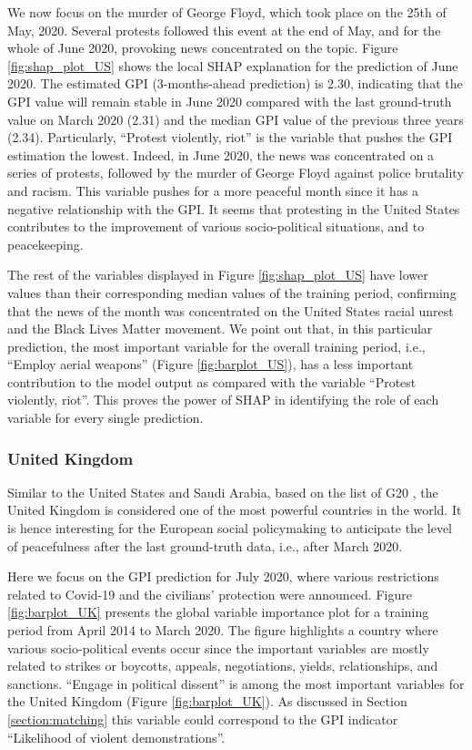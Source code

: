 \documentclass{bmcart}
\begin{document}
We now focus on the murder of George Floyd, which took place on the 25th of May, 2020. Several protests followed this event at the end of May, and for the whole of June 2020, provoking news concentrated on the topic. 
Figure \ref{fig:shap_plot_US} shows the local SHAP explanation for the prediction of June 2020. 
The estimated GPI (3-months-ahead prediction) is 2.30, indicating that the GPI value will remain stable in June 2020 compared with the last ground-truth value on March 2020 (2.31) and the median GPI value of the previous three years (2.34). 
Particularly, ``Protest violently, riot'' is the variable that pushes the GPI estimation the lowest. 
Indeed, in June 2020, the news was concentrated on a series of protests, followed by the murder of George Floyd against police brutality and racism. 
This variable pushes for a more peaceful month since it has a negative relationship with the GPI. 
It seems that protesting in the United States contributes to the improvement of various socio-political situations, and to peacekeeping. 

The rest of the variables displayed in Figure \ref{fig:shap_plot_US} have lower values than their corresponding median values of the training period, confirming that the news of the month was concentrated on the United States racial unrest and the Black Lives Matter movement. 
We point out that, in this particular prediction, the most important variable for the overall training period, i.e., ``Employ aerial weapons'' (Figure \ref{fig:barplot_US}), has a less important contribution to the model output as compared with the variable ``Protest violently, riot''. 
This proves the power of SHAP in identifying the role of each variable for every single prediction. 

\subsubsection*{\textbf{United Kingdom}} 
Similar to the United States and Saudi Arabia, based on the list of G20 \cite{cooper2013group}, the United Kingdom is considered one of the most powerful countries in the world. 
It is hence interesting for the European social policymaking to anticipate the level of peacefulness after the last ground-truth data, i.e., after March 2020.

Here we focus on the GPI prediction for July 2020, where various restrictions related to Covid-19 and the civilians' protection were announced. 
Figure \ref{fig:barplot_UK} presents the global variable importance plot for a training period from April 2014 to March 2020. 
The figure highlights a country where various socio-political events occur since the important variables are mostly related to strikes or boycotts, appeals, negotiations, yields, relationships, and sanctions. 
``Engage in political dissent'' is among the most important variables for the United Kingdom (Figure \ref{fig:barplot_UK}).
As discussed in Section \ref{section:matching} this variable could correspond to the GPI indicator ``Likelihood of violent demonstrations''.
\end{document}
